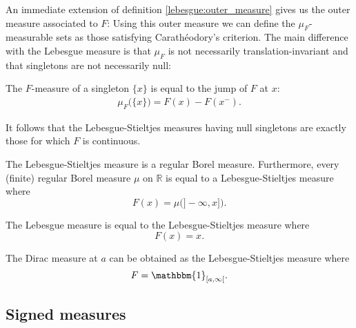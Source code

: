     An immediate extension of definition \ref{lebesgue:outer_measure} gives us the outer measure associated to $F$:
    Using this outer measure we can define the $\mu_F$-measurable sets as those satisfying Carath\'eodory's criterion. The main difference with the Lebesgue measure is that $\mu_F$ is not necessarily translation-invariant and that singletons are not necessarily null:
    \begin{property}
        The $F$-measure of a singleton $\{x\}$ is equal to the jump of $F$ at $x$:
        \begin{gather}
            \mu_F\big(\{x\}\big) = F(x) - F(x^-).
        \end{gather}
    \end{property}
    It follows that the Lebesgue-Stieltjes measures having null singletons are exactly those for which $F$ is continuous.

    \begin{property}[Regularity]
        The Lebesgue-Stieltjes measure is a regular Borel measure. Furthermore, every (finite) regular Borel measure $\mu$ on $\mathbb{R}$ is equal to a Lebesgue-Stieltjes measure where \[F(x) = \mu\big(]-\infty,x]\big).\]
    \end{property}

    \begin{example}
        The Lebesgue measure is equal to the Lebesgue-Stieltjes measure where \[F(x)=x.\]
    \end{example}
    \begin{example}
        The Dirac measure at $a$ can be obtained as the Lebesgue-Stieltjes measure where \[F=\mathbbm{1}_{[a,\infty[}.\]
    \end{example}

\subsection{Signed measures}

